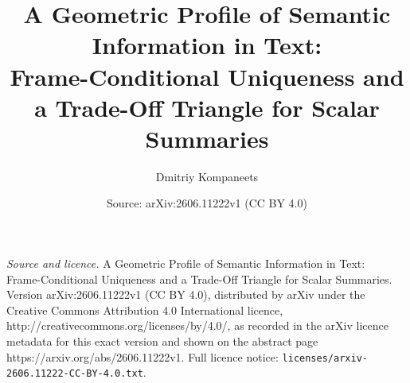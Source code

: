 \documentclass[10pt,a4paper]{amsart}
\title{A Geometric Profile of Semantic Information in Text:\\ Frame-Conditional Uniqueness and a Trade-Off Triangle for Scalar Summaries}
\author{Dmitriy Kompaneets}
\date{Source: arXiv:2606.11222v1 (CC BY 4.0)}
\begin{document}
\maketitle

\noindent\emph{Source and licence.} A Geometric Profile of Semantic Information in Text:\\ Frame-Conditional Uniqueness and a Trade-Off Triangle for Scalar Summaries. Version arXiv:2606.11222v1 (CC BY 4.0), distributed by arXiv under the Creative Commons Attribution 4.0 International licence, http://creativecommons.org/licenses/by/4.0/, as recorded in the arXiv licence metadata for this exact version and shown on the abstract page https://arxiv.org/abs/2606.11222v1. Full licence notice: \texttt{licenses/arxiv-2606.11222-CC-BY-4.0.txt}.\par\smallskip
\end{document}
